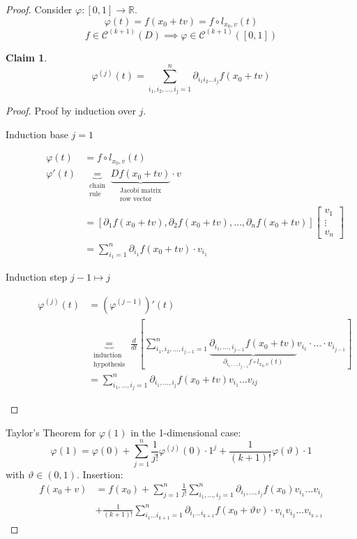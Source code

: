 \documentclass{article}
\newtheorem*{claim}{Claim}%
\begin{document}
\begin{proof}
  Consider $\varphi: [0,1] \to \mathbb R$.
  \[ \varphi(t) = f(x_0 + tv) = f \circ l_{x_0,v}(t) \]
  \[ f \in \mathcal C^{(k+1)}(D) \implies \varphi \in \mathcal C^{(k+1)}([0,1]) \]
  \begin{claim}
    \[ \varphi^{(j)}(t) = \sum_{i_1,i_2,\dots,i_j=1}^n \partial_{i_1 i_2 \dots i_j} f(x_0 + tv) \]
  \end{claim}
  \begin{proof}
    Proof by induction over $j$.
    \begin{description}
      \item[Induction base $j = 1$]
        \begin{align*}
          \varphi(t) &= f \circ l_{x_0,v}(t) \\
          \varphi'(t) &\underbrace{=}_{\substack{\text{chain} \\ \text{rule}}} \underbrace{Df(x_0 + tv)}_{\substack{\text{Jacobi matrix} \\ \text{row vector}}} \cdot v \\
            &= [\partial_1 f(x_0 + tv), \partial_2 f(x_0 + tv), \dots, \partial_n f(x_0 + tv)]\begin{bmatrix} v_1 \\ \vdots \\ v_n \end{bmatrix} \\
            &= \sum_{i_1=1}^n \partial_{i_1} f(x_0 + tv) \cdot v_{i_1}
        \end{align*}
      \item[Induction step $j-1 \mapsto j$]
        \begin{align*}
          \varphi^{(j)}(t)
            &= (\varphi^{(j-1)})'(t) \\
            &\underbrace{=}_{\substack{\text{induction} \\ \text{hypothesis}}} \frac{d}{dt} \left[\sum_{i_1,i_2,\dots,i_{j-1}=1}^n \underbrace{\partial_{i_1,\dots,i_{j-1}} f(x_0 + tv)}_{\partial_{i_1,\dots,i_{j-1}} f \circ l_{x_0,v}(t)} v_{i_1} \cdot \dots \cdot v_{i_{j-1}} \right] \\
            &= \sum_{i_1,\dots,i_j = 1}^n \partial_{i_1, \dots, i_j} f(x_0 + tv) v_{i_1} \dots v_{ij}
        \end{align*}
    \end{description}
  \end{proof}
  Taylor's Theorem for $\varphi(1)$ in the 1-dimensional case:
  \[ \varphi(1) = \varphi(0) + \sum_{j=1}^n \frac{1}{j!} \varphi^{(j)}(0) \cdot 1^j + \frac{1}{(k+1)!} \varphi (\vartheta) \cdot 1 \]
  with $\vartheta \in (0,1)$.
  Insertion:
  \begin{align*}
    f(x_0 + v) &= f(x_0) + \sum_{j=1}^n \frac{1}{j!} \sum_{i_1,\dots,i_j=1}^n \partial_{i_1,\dots,i_j} f(x_0) v_{i_1} \dots v_{i_j} \\
               &+ \frac{1}{(k+1)!} \sum_{i_1 \dots i_{k+1}=1}^n \partial_{i_1 \dots i_{k+1}} f(x_0 + \vartheta v) \cdot v_{i_1} v_{i_2} \dots v_{i_{k+1}}
  \end{align*}


\end{proof}
\end{document}
